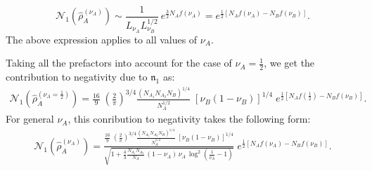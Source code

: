 \documentclass[aps,pra,reprint,superscriptaddress,twocolumn,notitlepage]{revtex4-1}
\numberwithin{equation}{section}
\begin{document}
\begin{widetext}
\begin{equation}
    \mathcal{N}_1(\hat\rho_A^{(\nu_A)})
    \sim \frac{1}{L_{\nu_A}  L_{\nu_B}^{1/2} } \ e^{\frac32  N_A f(\nu_A) } = e^{\frac12 \left[ N_A f(\nu_A) - N_B f(\nu_B) \right]}.
\end{equation}
The above expression applies to all values of $\nu_A$.



Taking all the prefactors into account for the case of $\nu_A = \frac12$, we get the contribution to negativity due to $\mathfrak{n}_1$ as:
\begin{equation}
\begin{aligned}
      \mathcal{N}_1(\hat\rho_A^{(\nu_A=\frac12)})
    = \frac{16}9 \; \left(\frac2\pi \right)^{3/4} \frac{\left( N_{A_1} N_{A_2} N_B \right)^{1/4} }{ N_A^{1/2} }
    \;
     \left[ \nu_B (1-\nu_B)  \right]^{1/4}
  \; e^{\frac12 \left[  N_A f(\frac12) - N_B f(\nu_B) \right]}.
\end{aligned}    
\end{equation}
For general $\nu_A$, this conribution to negativity takes the following form:
\begin{equation}
\begin{aligned}
     \mathcal{N}_1(\hat\rho_A^{(\nu_A)})
    =\frac{\frac{16}9 \; \left(\frac2\pi \right)^{3/4} \frac{\left( N_{A_1} N_{A_2} N_B \right)^{1/4} }{ N_A^{1/2} }
    \;
     \left[ \nu_B (1-\nu_B)  \right]^{1/4}}{\sqrt{ 1+ \frac43 \frac{N_{A_1} N_{A_2}}{N_A}  \, (1-\nu_A) \, \nu_A \, \log^2\left(\frac{1}{\nu_A}-1\right)    }}
  \; e^{\frac12 \left[  N_A f(\nu_A) - N_B f(\nu_B) \right]}.
\end{aligned}    
\end{equation}




\end{widetext}
\end{document}
